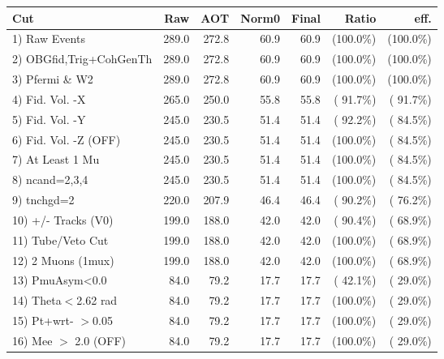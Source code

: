  \begin{table}[h!]\centering
 \begin{tabular}{||l||r|r|r|r|r|r||}
 \hline
 \hline
 Cut & Raw & AOT & Norm0 & Final & Ratio & eff.       \\
 \hline
  1) Raw Events           &        289.0 &        272.8 &         60.9 &         60.9 & (100.0\%) & (100.0\%) \\
  2) OBGfid,Trig+CohGenTh &        289.0 &        272.8 &         60.9 &         60.9 & (100.0\%) & (100.0\%) \\
  3) Pfermi \& W2         &        289.0 &        272.8 &         60.9 &         60.9 & (100.0\%) & (100.0\%) \\
  4) Fid. Vol. -X         &        265.0 &        250.0 &         55.8 &         55.8 & ( 91.7\%) & ( 91.7\%) \\
  5) Fid. Vol. -Y         &        245.0 &        230.5 &         51.4 &         51.4 & ( 92.2\%) & ( 84.5\%) \\
  6) Fid. Vol. -Z (OFF)   &        245.0 &        230.5 &         51.4 &         51.4 & (100.0\%) & ( 84.5\%) \\
  7) At Least 1 Mu        &        245.0 &        230.5 &         51.4 &         51.4 & (100.0\%) & ( 84.5\%) \\
  8) ncand=2,3,4          &        245.0 &        230.5 &         51.4 &         51.4 & (100.0\%) & ( 84.5\%) \\
  9) tnchgd=2             &        220.0 &        207.9 &         46.4 &         46.4 & ( 90.2\%) & ( 76.2\%) \\
 10) +/- Tracks (V0)      &        199.0 &        188.0 &         42.0 &         42.0 & ( 90.4\%) & ( 68.9\%) \\
 11) Tube/Veto Cut        &        199.0 &        188.0 &         42.0 &         42.0 & (100.0\%) & ( 68.9\%) \\
 12) 2 Muons (1mux)       &        199.0 &        188.0 &         42.0 &         42.0 & (100.0\%) & ( 68.9\%) \\
 13) PmuAsym<0.0          &         84.0 &         79.2 &         17.7 &         17.7 & ( 42.1\%) & ( 29.0\%) \\
 14) Theta$<$2.62 rad     &         84.0 &         79.2 &         17.7 &         17.7 & (100.0\%) & ( 29.0\%) \\
 15) Pt+wrt- $>$0.05      &         84.0 &         79.2 &         17.7 &         17.7 & (100.0\%) & ( 29.0\%) \\
 16) Mee $>$ 2.0  (OFF)   &         84.0 &         79.2 &         17.7 &         17.7 & (100.0\%) & ( 29.0\%) \\

\end{tabular}
\end{table}
